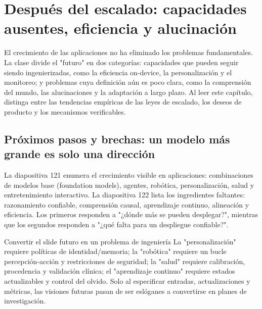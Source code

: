 \section{Después del escalado: capacidades ausentes, eficiencia y alucinación}

El crecimiento de las aplicaciones no ha eliminado los problemas fundamentales. La clase divide el "futuro" en dos categorías: capacidades que pueden seguir siendo ingenierizadas, como la eficiencia on-device, la personalización y el monitoreo; y problemas cuya definición aún es poco clara, como la comprensión del mundo, las alucinaciones y la adaptación a largo plazo. Al leer este capítulo, distinga entre las tendencias empíricas de las leyes de escalado, los deseos de producto y los mecanismos verificables.

\subsection{Próximos pasos y brechas: un modelo más grande es solo una dirección}

La diapositiva 121 enumera el crecimiento visible en aplicaciones: combinaciones de modelos base (foundation models), agentes, robótica, personalización, salud y entretenimiento interactivo. La diapositiva 122 lista los ingredientes faltantes: razonamiento confiable, comprensión causal, aprendizaje continuo, alineación y eficiencia. Los primeros responden a "¿dónde más se pueden desplegar?", mientras que los segundos responden a "¿qué falta para un despliegue confiable?".




\begin{knowledgebox}{Convertir el slide futuro en un problema de ingeniería}
La "personalización" requiere políticas de identidad/memoria; la "robótica" requiere un bucle percepción-acción y restricciones de seguridad; la "salud" requiere calibración, procedencia y validación clínica; el "aprendizaje continuo" requiere estados actualizables y control del olvido. Solo al especificar entradas, actualizaciones y métricas, las visiones futuras pasan de ser eslóganes a convertirse en planes de investigación.
\end{knowledgebox}

